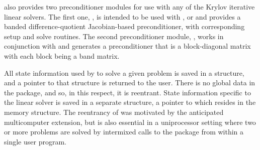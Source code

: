 {\cvodes} also provides two preconditioner modules for use with any of
the Krylov iterative linear solvers.  The first one, {\cvbandpre}, is
intended to be used with {\nvecs}, {\nvecopenmp} or {\nvecpthreads}
and provides a banded difference-quotient Jacobian-based
preconditioner, with corresponding setup and solve routines.  The second 
preconditioner module, {\cvbbdpre}, works in conjunction with {\nvecp}
and generates a preconditioner that is a block-diagonal matrix with
each block being a band matrix.

All state information used by {\cvodes} to solve a given problem is saved
in a structure, and a pointer to that structure is returned to the
user.  There is no global data in the {\cvodes} package, and so, in this
respect, it is reentrant. State information specific to the linear
solver is saved in a separate structure, a pointer to which resides in
the {\cvodes} memory structure. The reentrancy of {\cvodes} was motivated
by the anticipated multicomputer extension, but is also essential
in a uniprocessor setting where two or more problems are solved by
intermixed calls to the package from within a single user program.

